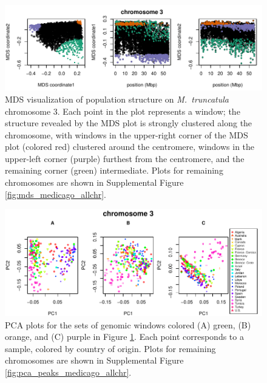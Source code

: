 \documentclass[11pt, oneside]{article}   	%
\begin{document}
\begin{figure}
    \begin{center}
       \includegraphics{Fig6_Together_MDS_plot_chr3_final}
    \end{center}
    \caption{
       MDS visualization of population structure on \textit{M.~truncatula} chromosome 3. 
       Each point in the plot represents a window;
       the structure revealed by the MDS plot is strongly clustered along the chromosome,
       with windows in the upper-right corner of the MDS plot (colored red) clustered around the centromere,
       windows in the upper-left corner (purple) furthest from the centromere,
       and the remaining corner (green) intermediate.
       Plots for remaining chromosomes are shown in Supplemental Figure \ref{fig:mds_medicago_allchr}.
       \label{fig:mds12_medicago}
    }
\end{figure}

\begin{figure}
    \begin{center}
       \includegraphics{Fig7_pca_plots_for_Medicago_chr3_3peaks_byMDS}
    \end{center}
    \caption{
        PCA plots for the sets of genomic windows colored (A) green, (B) orange, and (C) purple in Figure \ref{fig:mds12_medicago}. 
        Each point corresponds to a sample, colored by country of origin.
        Plots for remaining chromosomes are shown in Supplemental Figure \ref{fig:pca_peaks_medicago_allchr}.
        \label{fig:pca_medicago}
    }
\end{figure}
\end{document}
